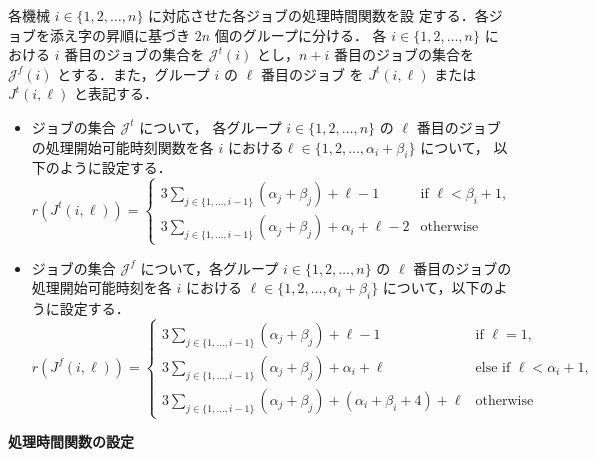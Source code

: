 \documentclass[12pt]{optlab-bachelor}
\begin{document}
  各機械 $i \in \{1,2,\ldots,n\}$ に対応させた各ジョブの処理時間関数を設
  定する．各ジョブを添え字の昇順に基づき $2n$ 個のグループに分ける． 各 $i
  \in \{1,2,\ldots,n\}$ における $i$ 番目のジョブの集合を
  $\mathcal{J}^t(i)$ とし，$n + i$ 番目のジョブの集合を
  $\mathcal{J}^f(i)$ とする．また，グループ $i$ の $\ell$ 番目のジョブ
  を $J^t(i,\ell)$ または $J^t(i,\ell)$ と表記する．
  \begin{itemize}
    \item ジョブの集合 $\mathcal{J}^t$ について， 各グループ $i \in
    \{1,2,\ldots, n\}$ の $\ell$ 番目のジョブの処理開始可能時刻関数を各
    $i$ における$\ell \in \{1,2,\ldots, \alpha_i + \beta_i\}$ について，
    以下のように設定する．
    $$r(J^t(i,\ell)) =
    \left\{ \begin{array}{lll} 3 \displaystyle
    \sum_{j \in \{1,\ldots,i - 1\}}(\alpha_j + \beta_j) + \ell - 1 &
    \text{if } \ell < \beta_i + 1, \\ 3 \displaystyle \sum_{j \in \{1,\ldots,i - 1\}}(\alpha_j + \beta_j) + \alpha_i + \ell - 2 & \text{otherwise} \end{array} \right.$$

    \item ジョブの集合 $\mathcal{J}^f$ について，各グループ $i \in \{1,2,\ldots, n\}$ の $\ell$ 番目のジョブの処理開始可能時刻を各 $i$ における $\ell \in \{1,2,\ldots,\alpha_i + \beta_i\}$ について，以下のように設定する．
    $$r(J^f(i,\ell)) =
    \left\{ \begin{array}{lll} 3 \displaystyle \sum_{j \in \{1,\ldots,i
    - 1\}}(\alpha_j + \beta_j) + \ell - 1 & \text{if } \ell = 1,
    \\ 3\displaystyle \sum_{j \in \{1,\ldots,i - 1\}}(\alpha_j + \beta_j) + \alpha_i + \ell  &
    \text{else if } \ell < \alpha_i + 1 , \\ 3\displaystyle \sum_{j \in \{1,\ldots,i - 1\}}(\alpha_j + \beta_j) + (\alpha_i + \beta_i + 4) + \ell & \text{otherwise} \end{array} \right.$$
  \end{itemize}

  \noindent \textbf{処理時間関数の設定}
\end{document}
